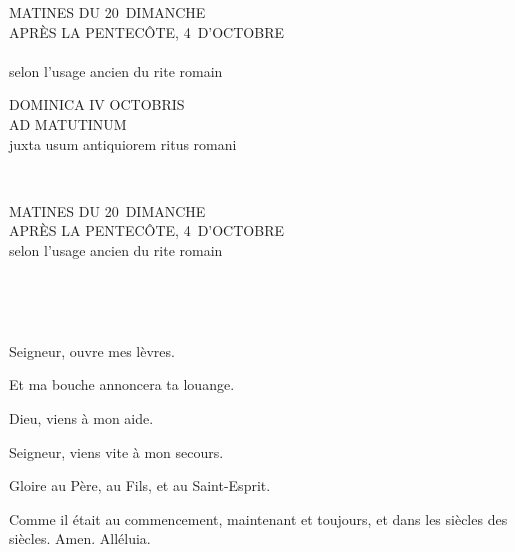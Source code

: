 \documentclass[twoside]{article}
\begin{document}
\null\vfill

\begin{center}\begin{doublespace}
{
\MakeUppercase{\Large Matines du 20\ieme~dimanche \\ après la Pentecôte, 4\ieme~d'octobre}\\~\\
selon l'usage ancien du rite romain
}
\end{doublespace}\end{center}

\vfill\newpage

\sloppy

\begin{paracol}[1]{2}

\begin{center}\begin{doublespace}

{
\MakeUppercase{\Large Dominica IV Octobris \\ ad Matutinum}\\
juxta usum antiquiorem ritus romani}
\end{doublespace}\end{center}


~~

\switchcolumn

\begin{center}\begin{doublespace}
{
\MakeUppercase{\Large Matines du 20\ieme~dimanche \\ après la Pentecôte, 4\ieme~d'octobre}\\
selon l'usage ancien du rite romain
}
\end{doublespace}\end{center}

~~

~~

\vv Seigneur, ouvre mes lèvres.

\rr Et ma bouche annoncera ta louange.

\vv Dieu, viens à mon aide.

\rr Seigneur, viens vite à mon secours.

\vv Gloire au Père, au Fils, et au Saint-Esprit.

\rr Comme il était au commencement, maintenant et toujours, et dans les siècles des siècles. Amen. Alléluia.


\end{paracol}
\end{document}
